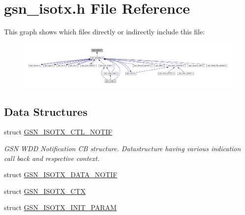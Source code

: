 \hypertarget{a00520}{
\section{gsn\_\-isotx.h File Reference}
\label{a00520}
}
This graph shows which files directly or indirectly include this file:
\nopagebreak
\begin{figure}[H]
\begin{center}
\leavevmode
\includegraphics[width=400pt]{a00754}
\end{center}
\end{figure}
\subsection*{Data Structures}
\begin{DoxyCompactItemize}
\item 
struct \hyperlink{a00101}{GSN\_\-ISOTX\_\-CTL\_\-NOTIF}
\begin{DoxyCompactList}\small\item\em GSN WDD Notification CB structure. Datastructure having various indication call back and respective context. \end{DoxyCompactList}\item 
struct \hyperlink{a00103}{GSN\_\-ISOTX\_\-DATA\_\-NOTIF}
\item 
struct \hyperlink{a00102}{GSN\_\-ISOTX\_\-CTX}
\item 
struct \hyperlink{a00104}{GSN\_\-ISOTX\_\-INIT\_\-PARAM}
\end{DoxyCompactItemize}
